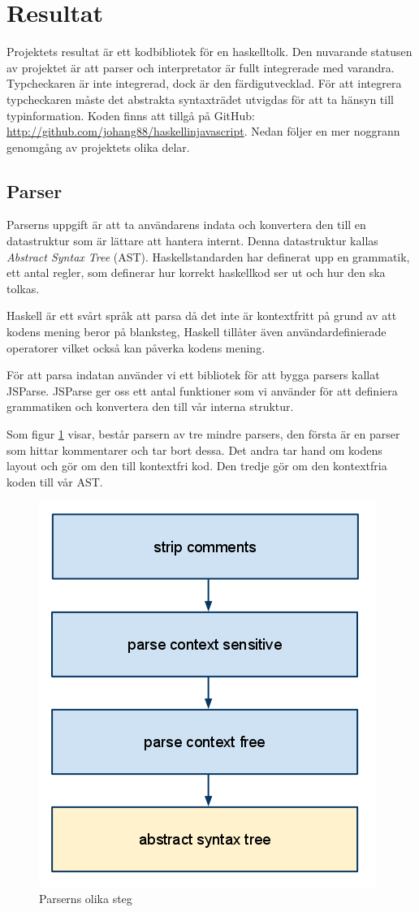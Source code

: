\section{Resultat}

Projektets resultat är ett kodbibliotek för en haskelltolk. Den nuvarande statusen av projektet är att parser och interpretator är fullt integrerade med varandra. Typcheckaren är inte integrerad, dock är den färdigutvecklad. För att integrera typcheckaren måste det abstrakta syntaxträdet utvigdas för att ta hänsyn till typinformation. 
Koden finns att tillgå på GitHub: \url{http://github.com/johang88/haskellinjavascript}. Nedan följer en mer noggrann genomgång av projektets olika delar. 

\subsection{Parser} 
Parserns uppgift är att ta användarens indata och konvertera den till en datastruktur 
som är lättare att hantera internt. Denna datastruktur kallas \emph{Abstract Syntax Tree} (AST). 
Haskellstandarden har definerat upp en grammatik, ett antal regler, som definerar hur korrekt haskellkod ser ut och hur den ska tolkas.

Haskell är ett svårt språk att parsa då det inte är kontextfritt på grund av att kodens mening beror på blanksteg, 
Haskell tillåter även användardefinierade operatorer vilket också kan påverka kodens mening. 

För att parsa indatan använder vi ett bibliotek för att bygga parsers kallat JSParse.
JSParse ger oss ett antal funktioner som vi använder för att definiera grammatiken och konvertera den till vår interna struktur.

Som figur \ref{fig:parser_steg} visar, består parsern av tre mindre parsers, den första är en parser som hittar kommentarer och tar bort dessa. 
Det andra tar hand om kodens layout och gör om den till kontextfri kod. Den tredje gör om den kontextfria koden till vår AST.

\begin{figure}[H]
    \begin{center}
        \includegraphics[width=.5\textwidth]{parser_1.png}
        \caption{Parserns olika steg}
        \label{fig:parser_steg} %
    \end{center}
\end{figure}

